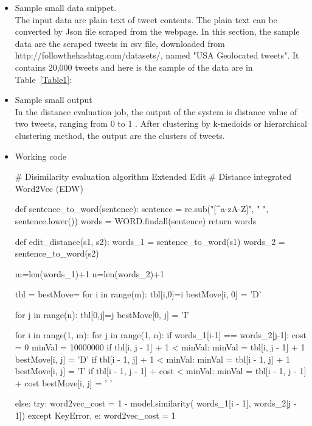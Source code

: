 \documentclass[10pt]{article}
\begin{document}
\begin{itemize} 
\item{}
Sample small data snippet. \\
The input data are plain text of tweet contents. The plain text can be converted by Json file scraped from the webpage. In this section, the sample data are the scraped tweets in csv file, downloaded from http://followthehashtag.com/datasets/, named "USA Geolocated tweets". It contains 20,000 tweets and here is the sample of the data are in Table~\ref{Table1}:


   
\item{}
Sample small output\\
In the distance evaluation job, the output of the system is distance value of two tweets, ranging from 0 to 1 . After clustering by  k-medoids or hierarchical clustering method, the output are the clusters of tweets. 
   
\item{}
Working code

\begin{python}
# Disimilarity evaluation algorithm Extended Edit 
# Distance integrated Word2Vec (EDW)

def sentence_to_word(sentence):
    sentence = re.sub("[^a-zA-Z]", " ", sentence.lower())
    words = WORD.findall(sentence)
    return words

def edit_distance(s1, s2):
    words_1 = sentence_to_word(s1)
    words_2 = sentence_to_word(s2)

    m=len(words_1)+1
    n=len(words_2)+1

    tbl = {} 
    bestMove={}
    for i in range(m):
	    tbl[i,0]=i
	    bestMove[i, 0] = 'D'

    for j in range(n):
        tbl[0,j]=j
        bestMove[0, j] = 'I'

    for i in range(1, m):
        for j in range(1, n):
            if words_1[i-1] == words_2[j-1]:
            cost = 0
            minVal = 10000000
                if tbl[i, j - 1] + 1 < minVal:
                    minVal = tbl[i, j - 1] + 1
                    bestMove[i, j] = 'D'
                if tbl[i - 1, j] + 1 < minVal:
                    minVal = tbl[i - 1, j] + 1
                    bestMove[i, j] = 'I'
                if tbl[i - 1, j - 1] + cost < minVal:
                    minVal = tbl[i - 1, j - 1] + cost
                    bestMove[i, j] = ' ' 

            else:
                try:
                    word2vec_cost = 1 - model.similarity(
                    words_1[i - 1],
                     words_2[j - 1])
                except KeyError, e:
                    word2vec_cost = 1  


\end{python}
\end{itemize}
\end{document}
